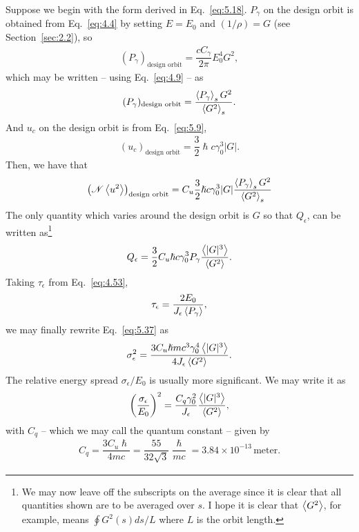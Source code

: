 Suppose we begin with the form derived in Eq.~\eqref{eq:5.18}. $P_\gamma$ on the design orbit is
obtained from Eq.~\eqref{eq:4.4} by setting $E = E_0$ and $(1/\rho) = G$ (see Section~\ref{sec:2.2}), so
\begin{align}
	(P_\gamma)_\text{design orbit} = \dfrac{c C_\gamma}{2\pi} E_0^4 G^2,
\end{align}
which may be written -- using Eq.~\eqref{eq:4.9} -- as
\begin{align}
	(P_\gamma)_\text{design orbit} = \dfrac{\left< P_\gamma \right>_s G^2}{\left< G^2 \right>_s}.
\end{align}
And $u_c$ on the design orbit is from Eq.~\eqref{eq:5.9},
\begin{align} \label{eq:5.40}
	(u_c)_\text{design orbit} = \dfrac{3}{2} \hslash c \gamma_0^3 |G|.
\end{align}
Then, we have that
\begin{align} \label{eq:5.41}
	\left( \mathscr{N} \left< u^2 \right> \right)_\text{design orbit} = C_u \dfrac{3}{2} \hslash c \gamma_0^3 |G| \dfrac{\left< P_\gamma \right>_s G^2}{\left< G^2 \right>_s}
\end{align}
The only quantity which varies around the design orbit is $G$ so that $Q_\epsilon$, can be written as\footnote{We may now leave off the subscripts on the average since it is clear that all
quantities shown are to be averaged over $s$. I hope it is clear that $\left< G^2 \right>$, for example, means $\oint G^2(s)ds/L$ where $L$ is the orbit length.}
\begin{align}
	Q_\epsilon = \dfrac{3}{2} C_u \hslash c \gamma_0^3 P_\gamma \dfrac{\left< |G|^3 \right>}{\left< G^2 \right>}.
\end{align}
Taking $\tau_\epsilon$ from Eq.~\eqref{eq:4.53},
\begin{align}
	\tau_\epsilon = \dfrac{2E_0}{J_\epsilon \left< P_\gamma \right>},
\end{align}
we may finally rewrite Eq.~\eqref{eq:5.37} as
\begin{align}
	\sigma_\epsilon^2 = \dfrac{3 C_u \hslash mc^3 \gamma_0^4 \left< |G|^3 \right>}{4 J_\epsilon \left< G^2 \right>}.
\end{align}
The relative energy spread $\sigma_\epsilon/E_0$ is usually more significant. We may write it as
\begin{align}\label{eq:5.45}
	\left(\dfrac{\sigma_\epsilon}{E_0}\right)^2 = \dfrac{C_q \gamma_0^2}{J_\epsilon} \dfrac{\left< |G|^3 \right>}{\left< G^2 \right>},
\end{align}
with $C_q$ -- which we may call the quantum constant -- given by
\begin{align} \label{eq:5.46}
	C_q = \dfrac{3 C_u \hslash}{4mc} = \dfrac{55}{32\sqrt{3}} \dfrac{\hslash}{mc} = 3.84 \times 10^{-13}\,\text{meter}.
\end{align}
